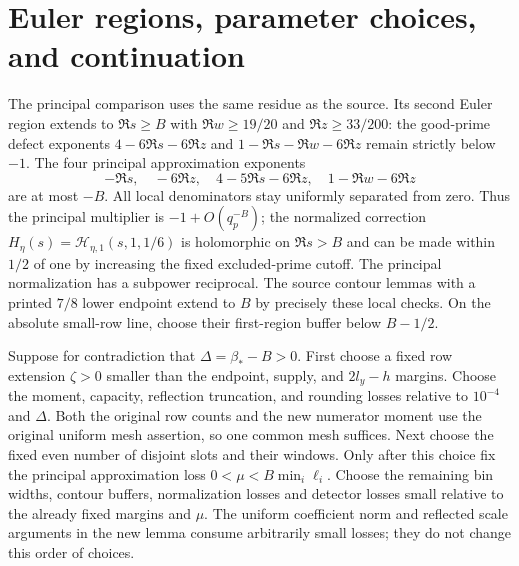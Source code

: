 \documentclass[11pt]{article}
\newcommand{\Bstar}{\beta_*}
\begin{document}
\section{Euler regions, parameter choices, and continuation}

The principal comparison uses the same residue as the source. Its second
Euler region extends to $\Re s\ge B$ with $\Re w\ge19/20$ and
$\Re z\ge33/200$: the good-prime defect exponents
$4-6\Re s-6\Re z$ and $1-\Re s-\Re w-6\Re z$ remain strictly below
$-1$. The four principal approximation exponents
\[
 -\Re s,\quad -6\Re z,\quad 4-5\Re s-6\Re z,
 \quad 1-\Re w-6\Re z
\]
are at most $-B$. All local denominators stay uniformly separated from
zero. Thus the principal multiplier is $-1+O(q_p^{-B})$; the normalized
correction $H_\eta(s)=\mathcal H_{\eta,1}(s,1,1/6)$ is holomorphic
on $\Re s>B$ and can be made
within $1/2$ of one by increasing the fixed excluded-prime cutoff.
The principal normalization has a subpower reciprocal.
The source contour lemmas with a printed $7/8$ lower endpoint extend
to $B$ by precisely these local checks. On the absolute small-row line,
choose their first-region buffer below $B-1/2$.

Suppose for contradiction that $\Delta=\Bstar-B>0$.
First choose a fixed row extension $\zeta>0$ smaller than the endpoint,
supply, and $2l_y-h$ margins. Choose the moment, capacity, reflection
truncation, and rounding losses relative to $10^{-4}$ and $\Delta$.
Both the original row counts and the new numerator moment use the
original uniform mesh assertion, so one common mesh suffices.
Next choose the fixed even number of disjoint slots and their windows.
Only after this choice fix the principal approximation loss
$0<\mu<B\min_i\ell_i$. Choose the remaining bin widths, contour buffers,
normalization losses and detector losses small relative to the already
fixed margins and $\mu$. The uniform coefficient norm and reflected
scale arguments in the new lemma consume arbitrarily small losses;
they do not change this order of choices.
\end{document}
